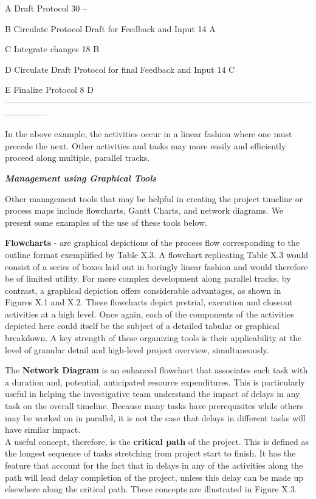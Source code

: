 \documentclass[]{book}
\begin{document}
A Draft Protocol 30 --

B Circulate Protocol Draft for Feedback and Input 14 A

C Integrate changes 18 B

D Circulate Draft Protocol for final Feedback and Input 14 C

E Finalize Protocol 8 D
---------------------------------------------------------------------------------------------------------------------------

In the above example, the activities occur in a linear fashion where one
must precede the next. Other activities and tasks may more easily and
efficiently proceed along multiple, parallel tracks.

\textbf{\emph{Management using Graphical Tools}}

Other management tools that may be helpful in creating the project
timeline or process maps include flowcharts, Gantt Charts, and network
diagrams. We present some examples of the use of these tools below.

\textbf{Flowcharts} - are graphical depictions of the process flow
corresponding to the outline format exemplified by Table X.3. A
flowchart replicating Table X.3 would consist of a series of boxes laid
out in boringly linear fashion and would therefore be of limited
utility. For more complex development along parallel tracks, by
contrast, a graphical depiction offers considerable advantages, as shown
in Figures X.1 and X.2. These flowcharts depict pretrial, execution and
closeout activities at a high level. Once again, each of the components
of the activities depicted here could itself be the subject of a
detailed tabular or graphical breakdown. A key strength of these
organizing tools is their applicability at the level of granular detail
and high-level project overview, simultaneously.

The \textbf{Network Diagram} is an enhanced flowchart that associates
each task with a duration and, potential, anticipated resource
expenditures. This is particularly useful in helping the investigative
team understand the impact of delays in any task on the overall
timeline. Because many tasks have prerequisites while others may be
worked on in parallel, it is not the case that delays in different tasks
will have similar impact.\\[2\baselineskip]A useful concept, therefore,
is the \textbf{critical path} of the project. This is defined as the
longest sequence of tasks stretching from project start to finish. It
has the feature that account for the fact that in delays in any of the
activities along the path will lead delay completion of the project,
unless this delay can be made up elsewhere along the critical path.
These concepts are illustrated in Figure X.3.
\end{document}
